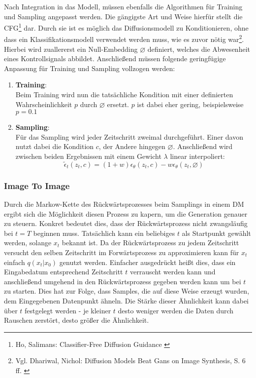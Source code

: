 Nach Integration in das Modell, müssen ebenfalls die Algorithmen für Training und Sampling angepasst werden. Die gängigste Art und Weise hierfür stellt die \ac{CFG}\footnote{
    Ho, Salimans: Classifier-Free Diffusion Guidance
    \cite{ho2022classifierfreediffusionguidance}
} dar. Durch sie ist es möglich das Diffusionsmodell zu Konditionieren, ohne dass ein Klassifikationsmodell verwendet werden muss, wie es zuvor nötig war\footnote{
    Vgl. Dhariwal, Nichol: Diffusion Models Beat Gans on Image Synthesis, S. 6 ff.
    \cite{NEURIPS2021_49ad23d1}
}. 
Hierbei wird zuallererst ein Null-Embedding $\diameter$ definiert, welches die Abwesenheit eines Kontrollsignals abbildet. Anschließend müssen folgende geringfügige Anpassung für Training und Sampling vollzogen werden:
\begin{enumerate}
    \item \textbf{Training}:\\
    Beim Training wird nun die tatsächliche Kondition mit einer definierten Wahrscheinlichkeit $p$ durch $\diameter$ ersetzt. $p$ ist dabei eher gering, beispielsweise $p=0.1$
    \item \textbf{Sampling}:\\
    Für das Sampling wird jeder Zeitschritt zweimal durchgeführt. Einer davon nutzt dabei die Kondition $c$, der Andere hingegen $\diameter$. Anschließend wird zwischen beiden Ergebnissen mit einem Gewicht $\lambda$ linear interpoliert:
    \begin{equation}
        \tilde \epsilon_t(z_t, c) = (1+w)\epsilon_\theta(z_t, c)
        - w\epsilon_\theta(z_t, \diameter)
    \end{equation}
\end{enumerate}

\subsubsection{Image To Image}

Durch die Markow-Kette des Rückwärtsprozesses beim Samplings in einem \ac{DM} ergibt sich die Möglichkeit diesen Prozess zu kapern, um die Generation genauer zu steuern. Konkret bedeutet dies, dass der Rückwärtsprozess nicht zwangsläufig bei $t=T$ beginnen muss. Tatsächlich kann ein beliebiges $t$ als Startpunkt gewählt werden, solange $x_t$ bekannt ist. Da der Rückwärtsprozess zu jedem Zeitschritt versucht den selben Zeitschritt im Forwärtsprozess zu approximieren kann für $x_t$ einfach $q(x_t|x_0)$ genutzt werden. Einfacher ausgedrückt heißt dies, dass ein Eingabedatum entsprechend Zeitschritt $t$ verrauscht werden kann und anschließend umgehend in den Rückwärtsprozess gegeben werden kann um bei $t$ zu starten. Dies hat zur Folge, dass Samples, die auf diese Weise erzeugt wurden, dem Eingegebenen Datenpunkt ähneln. Die Stärke dieser Ähnlichkeit kann dabei über $t$ festgelegt werden - je kleiner $t$ desto weniger werden die Daten durch Rauschen zerstört, desto größer die Ähnlichkeit.


